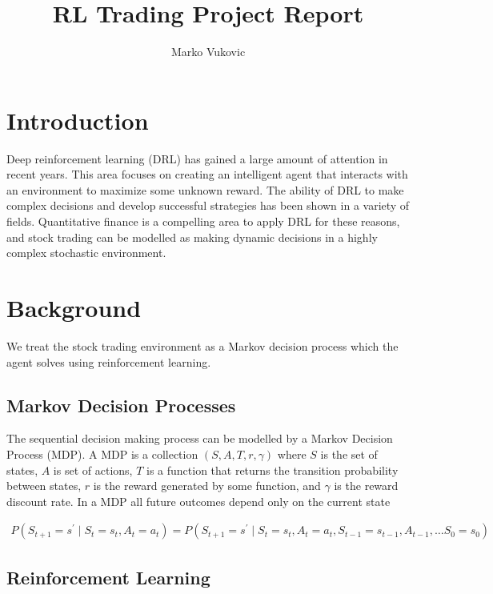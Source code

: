 \documentclass[a4paper]{article}
\title{RL Trading Project Report}
\author{Marko Vukovic}
\begin{document}
\maketitle

\section{Introduction}

Deep reinforcement learning (DRL) has gained a large amount of attention in recent years. This area focuses on creating an intelligent agent that interacts with an environment to maximize some unknown reward. The ability of DRL to make complex decisions and develop successful strategies has been shown in a variety of fields. Quantitative finance is a compelling area to apply DRL for these reasons, and stock trading can be modelled as making dynamic decisions in a highly complex stochastic environment.

\section{Background}

We treat the stock trading environment as a Markov decision process which the agent solves using reinforcement learning.

\subsection{Markov Decision Processes}

The sequential decision making process can be modelled by a Markov Decision Process (MDP). A MDP is a collection $(S, A, T, r, \gamma)$ where $S$ is the set of states, $A$ is set of actions, $T$ is a function that returns the transition probability between states, $r$ is the reward generated by some function, and $\gamma$ is the reward discount rate. In a MDP all future outcomes depend only on the current state

\begin{align*}
	P\left(S_{t+1}=s^{\prime} \mid S_{t}=s_{t}, A_{t}=a_{t}\right)
	=
	P\left(S_{t+1}=s^{\prime} \mid S_{t}=s_{t}, A_{t}=a_{t}, S_{t-1}=s_{t-1}, A_{t-1}, \ldots S_{0}=s_{0}\right)
\end{align*}


\subsection{Reinforcement Learning}
\end{document}
